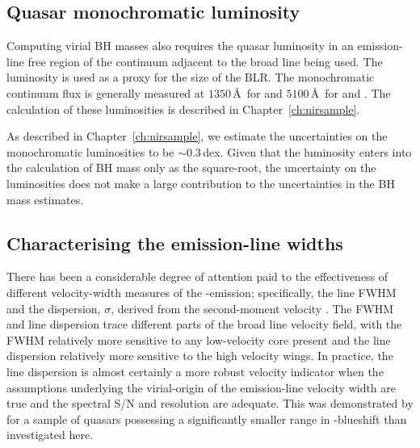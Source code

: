 \subsection{Quasar monochromatic luminosity}

Computing virial BH masses also requires the quasar luminosity in an emission-line free region of the continuum adjacent to the broad line being used. 
The luminosity is used as a proxy for the size of the BLR. 
The monochromatic continuum flux is generally measured at $1350$\,\AA\ for  and $5100$\,\AA\, for \ha and \hbns. 
The calculation of these luminosities is described in Chapter~\ref{ch:nirsample}. 

As described in Chapter~\ref{ch:nirsample}, we estimate the uncertainties on the monochromatic luminosities to be $\sim0.3$\,dex. 
Given that the luminosity enters into the calculation of BH mass only as the square-root, the uncertainty on the luminosities does not make a large contribution to the uncertainties in the BH mass estimates.  

\subsection{Characterising the emission-line widths}
\label{sub:charemprof}

There has been a considerable degree of attention paid to the effectiveness of different velocity-width measures of the -emission; specifically, the line FWHM and the dispersion, $\sigma$, derived from the second-moment velocity \citep[e.g.][]{assef11, denney13}.
The FWHM and line dispersion trace different parts of the broad line velocity field, with the FWHM relatively more sensitive to any low-velocity core present and the line dispersion relatively more sensitive to the high velocity wings. 
In practice, the line dispersion is almost certainly a more robust velocity indicator when the assumptions underlying the virial-origin of the emission-line velocity width are true and the spectral S/N and resolution are adequate.
This was demonstrated by \citet{denney13} for a sample of quasars possessing a significantly smaller range in -blueshift than investigated here.


